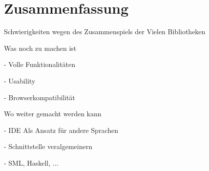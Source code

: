 \chapter{Zusammenfassung}

Schwierigkeiten wegen des Zusammenspiels der Vielen Bibliotheken

Was noch zu machen ist
 
 - Volle Funktionalitäten

 - Usability

 - Browserkompatibilität

Wo weiter gemacht werden kann

 - IDE Als Ansatz für andere Sprachen

 - Schnittstelle veralgemeinern

 - SML, Haskell, ...